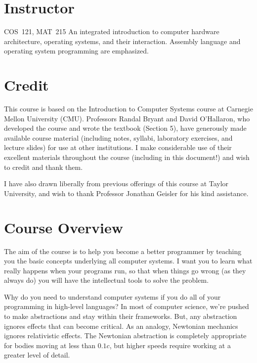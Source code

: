 \documentclass[11pt]{article}
\begin{document}


\section{Instructor}



\begin{catalogentry}{COS~121, MAT~215}
  An integrated introduction to computer hardware architecture,
  operating systems, and their interaction.
  Assembly language and operating system programming are emphasized.
\end{catalogentry}

\section{Credit}

This course is based on the Introduction to Computer Systems course
at Carnegie Mellon University (CMU).
Professors Randal Bryant and David O’Hallaron,
who developed the course and wrote the textbook (Section 5),
have generously made available course material
(including notes, syllabi, laboratory exercises, and lecture slides)
for use at other institutions.
I make considerable use of their excellent materials throughout the course
(including in this document!) and wish to credit and thank them.

I have also drawn liberally from previous offerings of this course
at Taylor University,
and wish to thank Professor Jonathan Geisler for his kind assistance.

\section{Course Overview}

The aim of the course is to help you become a better programmer by teaching you
the basic concepts underlying all computer systems. I want you to learn what
really happens when your programs run, so that when things go wrong (as they
always do) you will have the intellectual tools to solve the problem.

Why do you need to understand computer systems if you do all of your
programming in high-level languages? In most of computer science, we're pushed
to make abstractions and stay within their frameworks. But, any abstraction
ignores effects that can become critical. As an analogy, Newtonian mechanics
ignores relativistic effects. The Newtonian abstraction is completely
appropriate for bodies moving at less than \(0.1c\), but higher speeds require
working at a greater level of detail.
\end{document}
